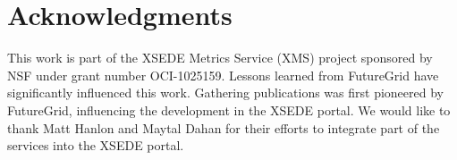 \documentclass{sig-alternate}
\begin{document}

\section{Acknowledgments}

This work is part of the XSEDE Metrics Service (XMS) project sponsored
by NSF under grant number OCI-1025159. Lessons learned from FutureGrid
have significantly influenced this work. Gathering publications was
first pioneered by FutureGrid, influencing the development in the XSEDE
portal. We would like to thank Matt Hanlon and Maytal Dahan for their
efforts to integrate part of the services into the XSEDE portal.




\end{document}

